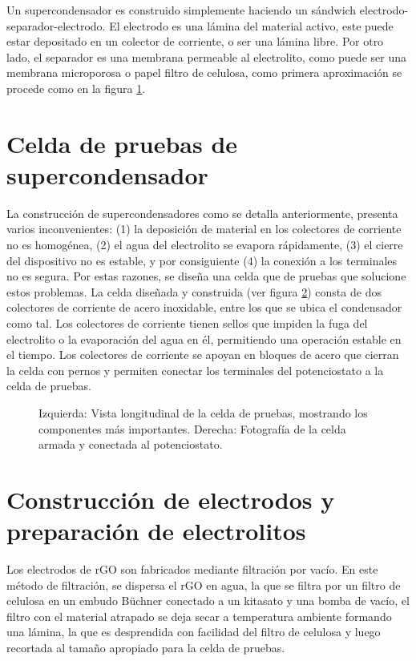 Un supercondensador es construido simplemente haciendo un sándwich electrodo-separador-electrodo. El electrodo es una lámina del material activo, este puede estar depositado en un colector de corriente, o ser una lámina libre. Por otro lado, el separador es una membrana permeable al electrolito, como puede ser una membrana microporosa o papel filtro de celulosa, como primera aproximación se procede como en la figura \ref{fig:SC_process}.

\begin{figure}[h!]
	\centering
	\caption{}
	\label{fig:SC_process}
\end{figure}

\section{Celda de pruebas de supercondensador}
La construcción de supercondensadores como se detalla anteriormente, presenta varios inconvenientes: (1) la deposición de material en los colectores de corriente no es homogénea, (2) el agua del electrolito se evapora rápidamente, (3) el cierre del dispositivo no es estable, y por consiguiente (4) la conexión a los terminales no es segura. Por estas razones, se diseña una celda que de pruebas que solucione estos problemas.
La celda diseñada y construida (ver figura \ref{fig:celda_de_pruebas_SC}) consta de dos colectores de corriente de acero inoxidable, entre los que se ubica el condensador como tal. Los colectores de corriente tienen sellos que impiden la fuga del electrolito o la evaporación del agua en él, permitiendo una operación estable en el tiempo. Los colectores de corriente se apoyan en bloques de acero que cierran la celda con pernos y permiten conectar los terminales del potenciostato a la celda de pruebas.

\begin{figure}[h!]
	\centering
	\caption{Izquierda: Vista longitudinal de la celda de pruebas, mostrando los componentes más importantes. Derecha: Fotografía de la celda armada y conectada al potenciostato.}
	\label{fig:celda_de_pruebas_SC}
\end{figure}

\section{Construcción de electrodos y preparación de electrolitos}
Los electrodos de rGO son fabricados mediante filtración por vacío. En este método de filtración, se dispersa el rGO en agua, la que se filtra por un filtro de celulosa en un embudo Büchner conectado a un kitasato y una bomba de vacío, el filtro con el material atrapado se deja secar a temperatura ambiente formando una lámina, la que es desprendida con facilidad del filtro de celulosa y luego recortada al tamaño apropiado para la celda de pruebas.

